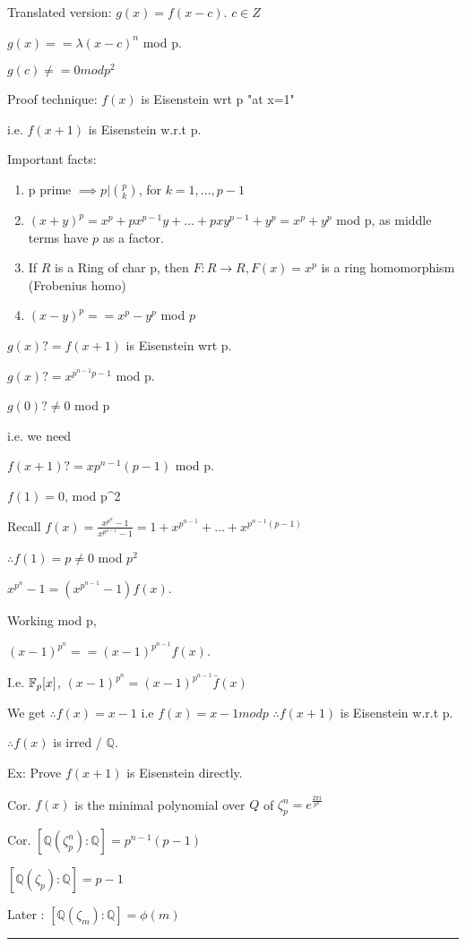 \documentclass[twoside]{article}
\newcommand{\Q}{\mathbb{Q}}
\newenvironment{proof}{{\bf Proof:}}{\hfill\rule{2mm}{2mm}}
\begin{document}
    Translated version: $g(x) = f(x-c)$. $c \in Z$ 
    
    $g(x) == \lambda(x-c)^n$ mod p. 

    $g(c) \not== 0 mod p^2$ 

    Proof technique: $f(x)$ is Eisenstein wrt p "at x=1"

    i.e. $f(x+1)$ is Eisenstein w.r.t p.

    Important facts:
    \begin{enumerate}
        \item p prime $\implies p \vert {p \choose k}$, for $k = 1,...,p-1$ 
        \item $(x + y)^p = x^p + px^{p-1}y + \dots + p xy^{p-1} + y^p = x^p + y^p$ mod p, as middle terms have $p$ as a factor.  
        \item If $R$ is a Ring of char p, then $F : R \rightarrow R, F(x) = x^p$ is a ring homomorphism (Frobenius homo)
        \item $(x-y)^p == x^p - y^p$ mod $p$
    \end{enumerate}

    \begin{proof}
        $g(x) ?= f(x + 1)$ is Eisenstein wrt p. 

        $g(x) ?= x^{p^{n-1}{p-1}}$ mod p. 

        $g(0) ?\not= 0$ mod p


        i.e. we need

        $f(x+1) ?= xp^{n-1}(p-1)$ mod p. 

        $f(1) = 0$, mod p^2

        Recall $f(x) = \frac{x^{p^n} - 1}{x^{p^{n-1}} - 1} = 1 + x^{p^{n-1}} + ... + x^{p^{n-1}(p-1)}$

        $\therefore f(1) = p \neq 0 $ mod $p^2$

        $x^{p^n} - 1 = (x^{p^{n-1}} - 1)f(x)$. 

        Working mod p,

        $(x - 1)^{p^n} == (x-1)^{p^{n-1}}f(x)$.

        I.e. $\mathbb{F}_p[x]$, $(x-1)^{p^n} = (x-1)^{p^{n-1}}\bar f(x)$

        We get $\therefore f(x) = x-1$
        i.e $f(x) = x-1 mod p$
        $\therefore f(x+1)  $ is Eisenstein w.r.t p. 

        $\therefore f(x)$ is irred / $\Q$. 

        Ex: Prove $f(x+1)$ is Eisenstein directly. 

        Cor. $f(x)$ is the minimal polynomial over $Q$ of $\zeta_p^n = e^{\frac{2\pi i}{p^n}}$

        Cor. $[\Q(\zeta_p^n):\Q] = p^{n-1}(p-1)$

        $[\Q(\zeta_p) : \Q] = p - 1$

        Later : $[\Q(\zeta_m) : \Q] = \phi(m)$
    \end{proof}
    
\end{document}
